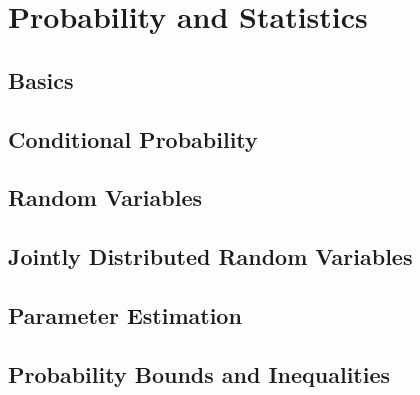 \documentclass[twoside,twocolumn]{article}
\begin{document}
\section{Probability and Statistics}
\subsection{Basics}
\subsection{Conditional Probability}
\subsection{Random Variables}
\subsection{Jointly Distributed Random Variables}
\subsection{Parameter Estimation}
\subsection{Probability Bounds and Inequalities}
\end{document}
